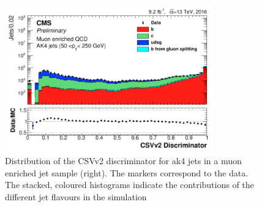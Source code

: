 \begin{figure}
\centering
    \includegraphics[width=0.8\textwidth]{./Figures/reconstruction/csv_fig.png}
  \caption{\label{fig:csv_fig} Distribution of the CSVv2 discriminator for ak4 jets 
in a muon enriched jet sample (right). The markers correspond to the data. 
The stacked, coloured histograms indicate the contributions of the different 
jet flavours in the simulation \cite{csv_fig}}
\end{figure}
